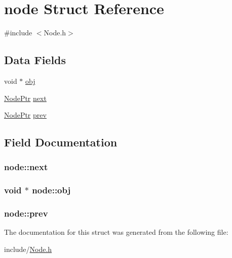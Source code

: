 \hypertarget{structnode}{\section{node Struct Reference}
\label{structnode}
}


{\ttfamily \#include $<$Node.\-h$>$}

\subsection*{Data Fields}
\begin{DoxyCompactItemize}
\item 
void $\ast$ \hyperlink{structnode_aa265249d0b682fcde004196309c6ed73}{obj}
\item 
\hyperlink{include_2Node_8h_aa6eec21621b8638e350fd0ec238a9715}{Node\-Ptr} \hyperlink{structnode_a29ed78f5e5f0fea79b113e047d18997d}{next}
\item 
\hyperlink{include_2Node_8h_aa6eec21621b8638e350fd0ec238a9715}{Node\-Ptr} \hyperlink{structnode_a8f67d90e34c478e9dd9a5bd51574c8c4}{prev}
\end{DoxyCompactItemize}


\subsection{Field Documentation}
\hypertarget{structnode_a29ed78f5e5f0fea79b113e047d18997d}{
\subsubsection[{next}]{ node\-::next}}\label{structnode_a29ed78f5e5f0fea79b113e047d18997d}
\hypertarget{structnode_aa265249d0b682fcde004196309c6ed73}{
\subsubsection[{obj}]{\setlength{\rightskip}{0pt plus 5cm}void $\ast$ node\-::obj}}\label{structnode_aa265249d0b682fcde004196309c6ed73}
\hypertarget{structnode_a8f67d90e34c478e9dd9a5bd51574c8c4}{
\subsubsection[{prev}]{ node\-::prev}}\label{structnode_a8f67d90e34c478e9dd9a5bd51574c8c4}


The documentation for this struct was generated from the following file\-:\begin{DoxyCompactItemize}
\item 
include/\hyperlink{include_2Node_8h}{Node.\-h}\end{DoxyCompactItemize}
